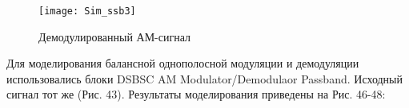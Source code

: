 \documentclass[10pt,a4paper]{article}
\begin{document}
\begin{figure}[h]\centering
	\texttt{[image: Sim\_ssb3]}
	\caption{Демодулированный АМ-сигнал}\label{fig.Sim_ssb3}
\end{figure}                                                                                                                                                                                                                                                                                                                                                                                                                                                                                                                                                                                                                                                                                                                                                                                                                                                                                                                                                                                                                                                                                                                                                                                                                                                                                                                                                                                                                                                                        

\FloatBarrier

Для моделирования балансной однополосной модуляции и демодуляции использовались блоки DSBSC AM Modulator/Demodulaor Passband. Исходный сигнал тот же (Рис. 43). Результаты моделирования приведены на Рис. 46-48:
\end{document}
